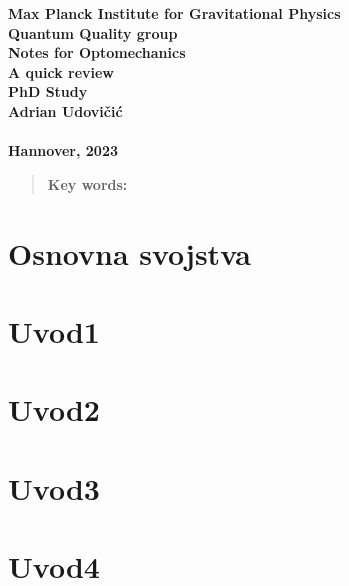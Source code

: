 \documentclass{article}
\begin{document}
\begin{titlepage}
	\begin{center}
		{\large \textbf{Max Planck Institute for Gravitational Physics}} \\[0.1cm]
		{\large \textbf{Quantum Quality group}}\\[0.1cm]
		{\large \textbf{Notes for Optomechanics}} \\[0.1cm]
		{\large \textbf{A quick review}}\\[1cm]
		{\LARGE\textbf{PhD Study}}\\[2.5cm]
		\vspace{2cm}
		{\LARGE \textbf{Adrian Udovičić}}\\[2.5cm]
		{\Huge \textbf{ }}\\[2cm]
		\vspace{1.5cm}
		\vfill
		\large\textbf{{Hannover, 2023} }
	\end{center}
\end{titlepage}


\newpage
{}
\tableofcontents
\newpage
{}
\begin{abstract}
	\textbf{Key words:}
\end{abstract}
\newpage

\section{Osnovna svojstva}

\newpage
\section{Uvod1}
\newpage
\section{Uvod2}
\newpage
\section{Uvod3}
\newpage
\section{Uvod4}
\newpage
\end{document}
